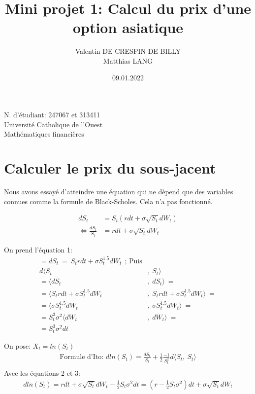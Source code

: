 \documentclass[a4paper,12pt]{scrartcl}
\title{Mini projet 1: Calcul du prix d'une option asiatique}
\author{Valentin DE CRESPIN DE BILLY \\ Matthias LANG}
\date{09.01.2022}
\begin{document}
\maketitle
\begin{center}

  \thispagestyle{empty}

  N. d'étudiant: 247067 et 313411\\
  Université Catholique de l'Ouest\\
  Mathématiques financières

\end{center}

\newpage

\tableofcontents

\newpage

\section{Calculer le prix du sous-jacent}

Nous avons essayé d'atteindre une équation qui ne dèpend que des variables connues comme la formule de Black-Scholes.
Cela n'a pas fonctionné.

\begin{align}%
dS_t  &=  S_t(rdt+\sigma \sqrt{S_t} dW_t) \\
     \iff \frac{dS_t}{S_t}  &=  rdt+\sigma \sqrt{S_t} dW_t
\end{align}


On prend l'équation 1:
\begin{align*}
= dS_t~=~S_trdt+\sigma S_t^{1.5} dW_t ~~
\text{; Puis} \\
d \langle S_t &, ~ S_t\rangle \\
=\langle dS_t &,~ dS_t\rangle ~=\\
=\langle S_trdt+\sigma S_t^{1.5} dW_t &,~
         S_trdt+\sigma S_t^{1.5} dW_t \rangle ~=\\
=\langle \sigma S_t^{1.5} dW_t &,~
         \sigma S_t^{1.5} dW_t \rangle ~=\\
=S_t^3 \sigma^2 \langle dW_t &,~  dW_t \rangle ~=\\
=S_t^3 \sigma^2 dt
\end{align*}


On pose: 
$X_t = ln(S_t)$
\begin{align}
\text{Formule d'Ito: } dln(S_t) = \frac{dS_t}{S_t} + \frac{1}{2} \frac{-1}{S_t^2}d \langle S_t, ~S_t \rangle \\
\end{align}
Avec les équations 2 et 3:
\begin{align}
dln(S_t) = 
rdt + \sigma \sqrt{S_t} dW_t - \frac{1}{2}S_t \sigma^2 dt =
(r - \frac{1}{2}S_t\sigma^2)dt + \sigma\sqrt{S_t}dW_t
\end{align}
\end{document}
